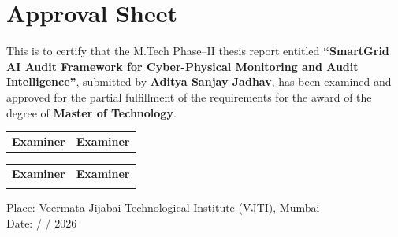 \chapter*{Approval Sheet}

\noindent
This is to certify that the M.Tech Phase–II thesis report entitled
\textbf{``SmartGrid AI Audit Framework for Cyber-Physical Monitoring and Audit Intelligence''},
submitted by \textbf{Aditya Sanjay Jadhav}, has been examined and approved for the partial fulfillment of the requirements for the award of the degree of \textbf{Master of Technology}.

\vspace{2.5cm}

\noindent
\begin{tabular}{p{6cm} p{6cm}}
\textbf{Examiner} & \textbf{Examiner}  \\
\end{tabular}

\vspace{3cm}

\noindent
\begin{tabular}{p{6cm} p{6cm}}
\textbf{Examiner} & \textbf{Examiner} \\
 &  \\
\end{tabular}

\vspace{3cm}

\noindent
Place: Veermata Jijabai Technological Institute (VJTI), Mumbai \\[0.3cm]
Date: \underline{\hspace{2cm}} / \underline{\hspace{2cm}} / 2026
